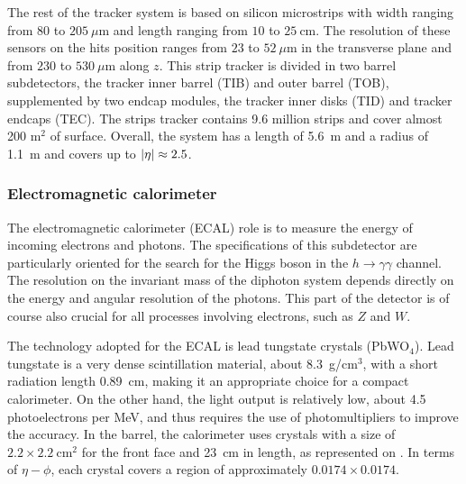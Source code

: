         The rest of the tracker system is based on silicon microstrips with width ranging
        from $80$ to $205~\mu\text{m}$ and length ranging from $10$ to $25~\text{cm}$.
        The resolution of these sensors on the hits position ranges from $23$ to $52~\mu\text{m}$
        in the transverse plane and from $230$ to $530~\mu\text{m}$ along $z$.
        This strip tracker is divided in two barrel subdetectors, the tracker inner barrel
        (TIB) and outer barrel (TOB), supplemented by two endcap modules, the tracker inner
        disks (TID) and tracker endcaps (TEC). The strips tracker contains 9.6 million strips
        and cover almost 200 m$^2$ of surface. Overall, the system has a length of 5.6~m
        and a radius of 1.1~m and covers up to $\left| \eta \right| \approx 2.5$.

            \subsubsection{Electromagnetic calorimeter}

        The electromagnetic calorimeter (ECAL) role is to measure the energy of incoming electrons
        and photons. The specifications of this subdetector are particularly oriented for
        the search for the Higgs boson in the $h \rightarrow \gamma \gamma$ channel. The resolution on the
        invariant mass of the diphoton system depends directly on the energy and angular
        resolution of the photons. This part of the detector is of course also crucial for
        all processes involving electrons, such as $Z$ and $W$.

        The technology adopted for the ECAL is lead tungstate crystals (PbWO$_4$). Lead
        tungstate is a very dense scintillation material, about 8.3~g/cm$^3$, with a short
        radiation length 0.89~cm, making it an appropriate choice for a compact calorimeter.
        On the other hand, the light output is relatively low, about 4.5 photoelectrons
        per MeV, and thus requires the use of photomultipliers to improve the accuracy.
        In the barrel, the calorimeter uses crystals with a size of $2.2\times2.2~\text{cm}^2$
        for the front face and 23~cm in length, as represented on .
        In terms of $\eta-\phi$, each crystal covers a region of approximately $0.0174
        \times 0.0174$.


